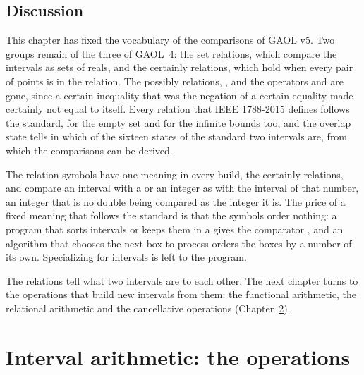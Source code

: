 \documentclass[12pt,a4paper,twoside,openright]{book}
\begin{document}
\section{Discussion}

This chapter has fixed the vocabulary of the comparisons of GAOL v5. Two
groups remain of the three of GAOL~4: the set relations, which compare the
intervals as sets of reals, and the certainly relations, which hold when
every pair of points is in the relation. The possibly relations,
,  and the operators \code{==}
and \code{!=} are gone, since a certain inequality that was the negation of
a certain equality made  certainly not equal to itself. Every
relation that IEEE 1788-2015 defines follows the standard, for the empty set
and for the infinite bounds too, and the overlap state tells in which of the
sixteen states of the standard two intervals are, from which the comparisons
can be derived.

\medskip
The relation symbols have one meaning in every build, the certainly
relations, and compare an interval with a  or an integer as
with the interval of that number, an integer that is no double being compared
as the integer it is. The price of a fixed meaning that follows the
standard is that the symbols order nothing: a program that sorts intervals
or keeps them in a  gives the comparator
, and an algorithm that chooses the next box
to process orders the boxes by a number of its own. Specializing
 for intervals is left to the program.

\medskip
The relations tell what two intervals are to each other. The next chapter
turns to the operations that build new intervals from them: the functional
arithmetic, the relational arithmetic and the cancellative operations
(Chapter~\ref{chap:arithmetic}).

\chapter{Interval arithmetic: the operations}\label{chap:arithmetic}
\end{document}
